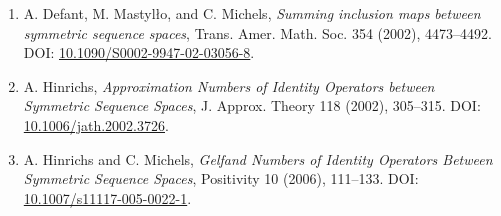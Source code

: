 \documentclass[11pt]{article}
\begin{document}
\begin{enumerate}
\item A. Defant, M. Mastyl\l{}o, and C. Michels, \emph{Summing inclusion maps
between symmetric sequence spaces}, Trans. Amer. Math. Soc. 354 (2002),
4473--4492. DOI: \href{https://doi.org/10.1090/S0002-9947-02-03056-8}
{10.1090/S0002-9947-02-03056-8}.
\item A. Hinrichs, \emph{Approximation Numbers of Identity Operators between
Symmetric Sequence Spaces}, J. Approx. Theory 118 (2002), 305--315. DOI:
\href{https://doi.org/10.1006/jath.2002.3726}{10.1006/jath.2002.3726}.
\item A. Hinrichs and C. Michels, \emph{Gelfand Numbers of Identity Operators
Between Symmetric Sequence Spaces}, Positivity 10 (2006), 111--133. DOI:
\href{https://doi.org/10.1007/s11117-005-0022-1}
{10.1007/s11117-005-0022-1}.
\end{enumerate}
\end{document}
